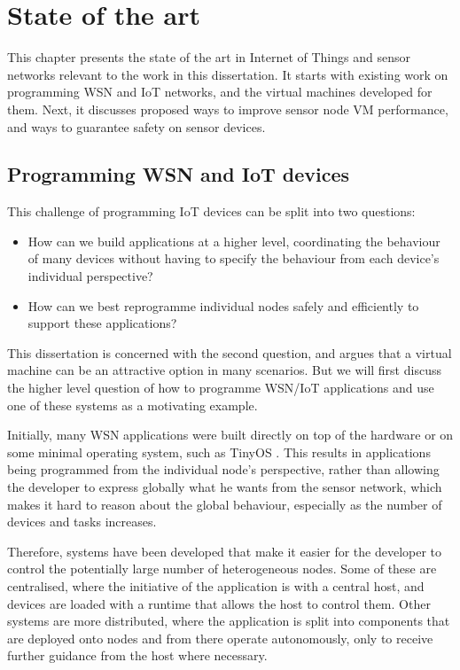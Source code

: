 \chapter{State of the art}
This chapter presents the state of the art in Internet of Things and sensor networks relevant to the work in this dissertation. It starts with existing work on programming WSN and IoT networks, and the virtual machines developed for them. Next, it discusses proposed ways to improve sensor node VM performance, and ways to guarantee safety on sensor devices.

\section{Programming WSN and IoT devices}

This challenge of programming IoT devices can be split into two questions:

\begin{itemize}
    \item How can we build applications at a higher level, coordinating the behaviour of many devices without having to specify the behaviour from each device's individual perspective?
    \item How can we best reprogramme individual nodes safely and efficiently to support these applications?
\end{itemize}

This dissertation is concerned with the second question, and argues that a virtual machine can be an attractive option in many scenarios. But we will first discuss the higher level question of how to programme WSN/IoT applications and use one of these systems as a motivating example.

Initially, many WSN applications were built directly on top of the hardware or on some minimal operating system, such as TinyOS \cite{Levis:2004ws}. This results in applications being programmed from the individual node's perspective, rather than allowing the developer to express globally what he wants from the sensor network, which makes it hard to reason about the global behaviour, especially as the number of devices and tasks increases.

Therefore, systems have been developed that make it easier for the developer to control the potentially large number of heterogeneous nodes. Some of these are centralised, where the initiative of the application is with a central host, and devices are loaded with a runtime that allows the host to control them. Other systems are more distributed, where the application is split into components that are deployed onto nodes and from there operate autonomously, only to receive further guidance from the host where necessary.


